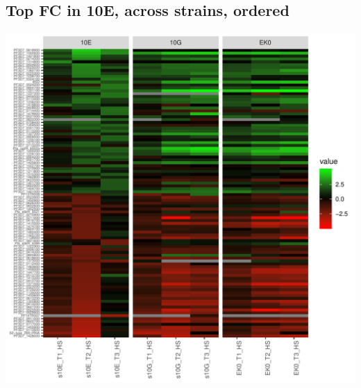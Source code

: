 \documentclass{article}\usepackage[]{graphicx}\usepackage[]{color}
\newenvironment{knitrout}{}{} %
\begin{document}
\subsection{Top FC in 10E, across strains, ordered}
\begin{knitrout}
\color{fgcolor}

{\centering \includegraphics[width=1\linewidth]{figure/minimal-heatmap_all_facet-1} 

}



\end{knitrout}
\clearpage
\end{document}
